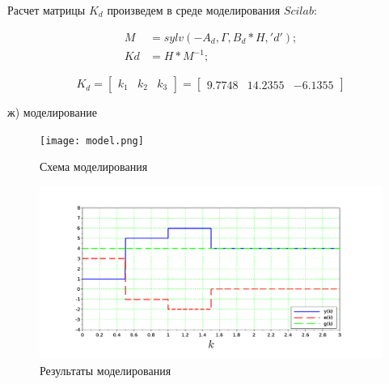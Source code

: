 \documentclass[a4paper,14pt]{extreport}
\begin{document}
Расчет матрицы $K_d$ произведем в среде моделирования $Scilab$:

\begin{align}
	M &= sylv(-A_d,\Gamma, B_d * H, 'd');\\
	Kd &= H * M^{-1};
\end{align} 

\begin{equation}
K_d = 
	\begin{bmatrix}
k_1 &   k_2 & k_3   
\end{bmatrix}=
	\begin{bmatrix}
	      9.7748 &   14.2355 & - 6.1355   
	\end{bmatrix}
\end{equation}

ж) моделирование

\begin{figure}[H]
	\center\texttt{[image: model.png]}
	\caption{Схема моделирования}
	\label{fig:scr1}
\end{figure}
\begin{figure}[H]
	\center\includegraphics[width=0.7\linewidth]{model_res.png}
	\caption{Результаты моделирования }
	\label{fig:scr1}
\end{figure}
\end{document}
